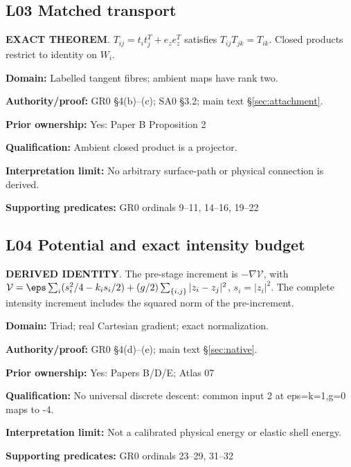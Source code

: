 \par\noindent\begin{minipage}{\linewidth}
\subsection*{L03 Matched transport}
\textbf{EXACT THEOREM}. \(T_{ij}=t_it_j^T+e_ze_z^T\) satisfies \(T_{ij}T_{jk}=T_{ik}\). Closed products restrict to identity on \(W_i\).\par
\textbf{Domain:} Labelled tangent fibres; ambient maps have rank two.\par
\textbf{Authority/proof:} GR0 \S{}4(b)--(c); SA0 \S{}3.2; main text \S\ref{sec:attachment}.\par
\textbf{Prior ownership:} Yes: Paper B Proposition 2\par
\textbf{Qualification:} Ambient closed product is a projector.\par
\textbf{Interpretation limit:} No arbitrary surface-path or physical connection is derived.\par
\textbf{Supporting predicates:} GR0 ordinals 9--11, 14--16, 19--22\par
\end{minipage}\par\medskip
\par\noindent\begin{minipage}{\linewidth}
\subsection*{L04 Potential and exact intensity budget}
\textbf{DERIVED IDENTITY}. The pre-stage increment is \(-\nabla\mathcal V\), with \(\mathcal V=\eps\sum_i(s_i^2/4-k_is_i/2)+(g/2)\sum_{\{i,j\}}|z_i-z_j|^2\), \(s_i=|z_i|^2\). The complete intensity increment includes the squared norm of the pre-increment.\par
\textbf{Domain:} Triad; real Cartesian gradient; exact normalization.\par
\textbf{Authority/proof:} GR0 \S{}4(d)--(e); main text \S\ref{sec:native}.\par
\textbf{Prior ownership:} Yes: Papers B/D/E; Atlas 07\par
\textbf{Qualification:} No universal discrete descent: common input 2 at eps=k=1,g=0 maps to -4.\par
\textbf{Interpretation limit:} Not a calibrated physical energy or elastic shell energy.\par
\textbf{Supporting predicates:} GR0 ordinals 23--29, 31--32\par
\end{minipage}\par\medskip
